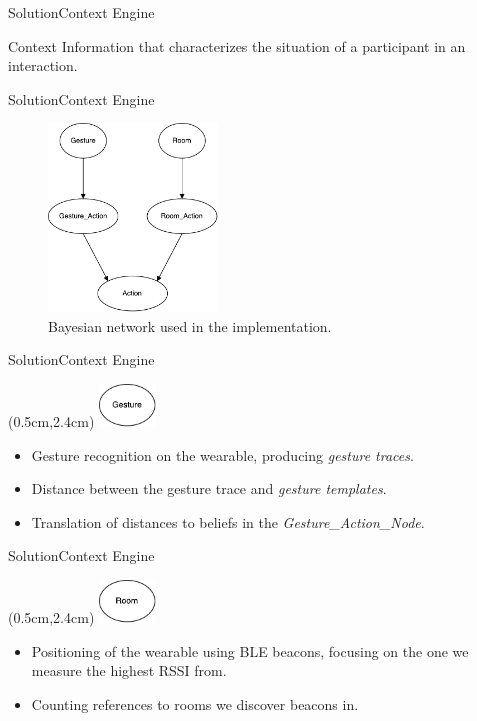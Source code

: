 \begin{frame}{Solution}{Context Engine}
\begin{block}{Context}
Information that characterizes the situation of a participant in an interaction.
\end{block}
\end{frame}

\begin{frame}{Solution}{Context Engine}
\begin{figure}[h]
\centering
\includegraphics[width=0.4\textwidth]{../images/bayesian-network-simple}
\caption{Bayesian network used in the implementation.}
\end{figure}
\end{frame}

\begin{frame}{Solution}{Context Engine}
\begin{textblock*}{1.5cm}(0.5cm,2.4cm)
\includegraphics[width=1.5cm]{../images/bayesian-network-gesture-node}
\end{textblock*}
\begin{itemize}
\item Gesture recognition on the wearable, producing \emph{gesture traces}.
\item Distance between the gesture trace and \emph{gesture templates}.
\item Translation of distances to beliefs in the \emph{Gesture\_Action\_Node}. 
\end{itemize}
\end{frame}

\begin{frame}{Solution}{Context Engine}
\begin{textblock*}{1.5cm}(0.5cm,2.4cm)
\includegraphics[width=1.5cm]{../images/bayesian-network-room-node}
\end{textblock*}
\begin{itemize}
\item Positioning of the wearable using BLE beacons, focusing on the one we measure the highest RSSI from.
\item Counting references to rooms we discover beacons in.
\end{itemize}
\end{frame}

